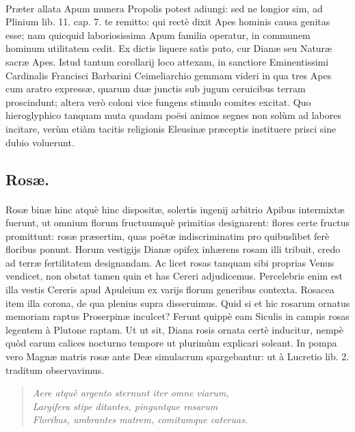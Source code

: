 \documentclass[a4paper, 11pt, oneside, polutonikogreek, latin]{article}
\begin{document}
\paragraph{}
Præter allata Apum munera Propolis potest adiungi: sed ne longior sim, ad Plinium lib. 11. cap. 7. te remitto: qui rectè dixit Apes hominis causa genitas esse; nam quicquid laboriosissima Apum familia operatur, in communem hominum utilitatem cedit. Ex dictis liquere satìs puto, cur Dianæ seu Naturæ sacræ Apes. Istud tantum corollarij loco attexam, in sanctiore Eminentissimi Cardinalis Francisci Barbarini Ceimeliarchio gemmam videri in qua tres Apes cum aratro expressæ, quarum duæ junctis sub jugum ceruicibus terram proscindunt; altera verò coloni vice fungens stimulo comites excitat. Quo hieroglyphico tanquam muta quadam poësi animos segnes non solùm ad labores incitare, verùm etiàm tacitis religionis Eleusinæ præceptis instituere prisci sine dubio voluerunt.
\clearpage
\subsection{Rosæ.}
\paragraph{}
Rosæ binæ hinc atquè hinc dispositæ, solertis ingenij arbitrio Apibus intermixtæ fuerunt, ut omnium florum fructuumquè primitias designarent: flores certe fructus promittunt: rosæ præsertim, quas poëtæ indiscriminatim pro quibuslibet ferè floribus ponunt. Horum vestigijs Dianæ opifex inhærens rosam illi tribuit, credo ad terræ fertilitatem designandam. Ac licet rosas tanquam sibi proprias Venus vendicet, non obstat tamen quin et has Cereri adjudicemus. Percelebris enim est illa vestis Cereris apud Apuleium ex varijs florum generibus contexta. Rosacea item illa corona, de qua plenius supra disseruimus. Quid si et hic rosarum ornatus memoriam raptus Proserpinæ inculcet? Ferunt quippè eam Siculis in campis rosas legentem à Plutone raptam. Ut ut sit, Diana rosis ornata certè inducitur, nempè quòd earum calices nocturno tempore ut plurimùm explicari soleant. In pompa vero Magnæ matris rosæ ante Deæ simulacrum spargebantur: ut à Lucretio lib. 2. traditum observavimus.
\begin{quote}
\emph{Aere atquè argento sternunt iter omne viarum,}\\
\emph{Largifera stipe ditantes, pinguntque rosarum}\\
\emph{Floribus, umbrantes matrem, comitumque cateruas.}\\
\end{quote}
\vspace*{-8mm}
\end{document}

